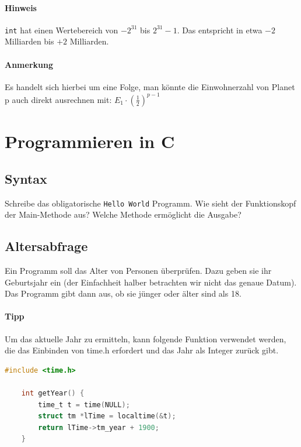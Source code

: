 \documentclass[11pt, a4paper]{article}
\newcommand\braces[1]{\left(#1\right)}
\newif\ifshowsolution
\begin{document}
\paragraph{Hinweis} \texttt{int} hat einen Wertebereich von $-2^{31}$ bis $2^{31}-1$. Das entspricht in etwa $-2$ Milliarden bis $+2$ Milliarden.
\paragraph{Anmerkung} Es handelt sich hierbei um eine Folge, man könnte die Einwohnerzahl von Planet p auch direkt ausrechnen mit: $E_1 \cdot \braces{\frac{1}{2}}^{p-1}$

\ifshowsolution
	
\fi

\newpage
\section{Programmieren in C}
\subsection{Syntax}
Schreibe das obligatorische \texttt{Hello World} Programm. Wie sieht der Funktionskopf der Main-Methode aus? Welche Methode ermöglicht die Ausgabe?

\ifshowsolution
	
\fi

\subsection{Altersabfrage}
Ein Programm soll das Alter von Personen überprüfen. Dazu geben sie ihr Geburtsjahr ein (der Einfachheit halber betrachten wir nicht das genaue Datum). Das Programm gibt dann aus, ob sie jünger oder älter sind als 18.

\paragraph{Tipp} Um das aktuelle Jahr zu ermitteln, kann folgende Funktion verwendet werden, die das Einbinden von time.h erfordert und das Jahr als Integer zurück gibt.
\begin{lstlisting}[language=C]
	#include <time.h>

	int getYear() {
		time_t t = time(NULL);
		struct tm *lTime = localtime(&t);
		return lTime->tm_year + 1900;
	}
\end{lstlisting}
\end{document}
